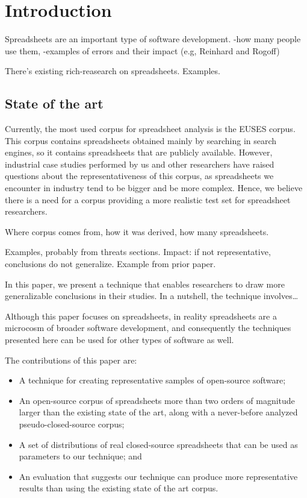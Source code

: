 \documentclass{sig-alternate} %
\begin{document}
\section{Introduction}

Spreadsheets are an important type of software development.
-how many people use them,
-examples of errors and their impact (e.g, Reinhard and Rogoff)

There's existing rich-reasearch on spreadsheets.
Examples.

\subsection{State of the art}
Currently, the most used corpus for spreadsheet analysis is the EUSES corpus. This corpus contains spreadsheets obtained mainly by searching in search engines, so it contains spreadsheets that are publicly available. However, industrial case studies performed by us and other researchers have raised questions about the representativeness of this corpus, as spreadsheets we  encounter in industry tend to be bigger and be more complex. Hence, we believe there is a need for a corpus providing a more realistic test set for spreadsheet researchers.

Where corpus comes from, how it was derived, how many spreadsheets.


Examples, probably from threats sections.
Impact: if not representative, conclusions do not generalize.
Example from prior paper.

In this paper, we present a technique that enables researchers
to draw more generalizable conclusions in their studies.
In a nutshell, the technique involves\ldots

Although this paper focuses on spreadsheets, in reality 
spreadsheets are a microcosm of broader software development,
and consequently the techniques presented here can be used for other 
types of software as well.

The contributions of this paper are:

\begin{itemize}
  \item A technique for creating representative samples of open-source
  		software;
  \item An open-source corpus of spreadsheets more than two orders of magnitude larger
 		than the existing state of the art, along with a never-before analyzed
 		pseudo-closed-source corpus;
  \item A set of distributions of real closed-source spreadsheets that can be
  		used as parameters to our technique; and
  \item An evaluation that suggests our technique can produce more representative
  		results than using the existing state of the art corpus.
\end{itemize}
\end{document}
